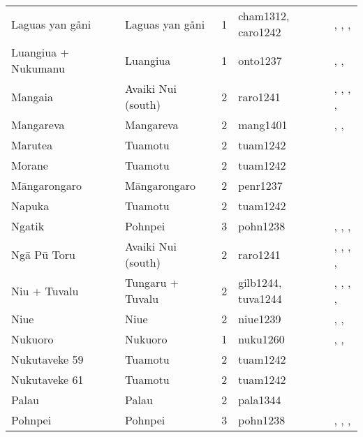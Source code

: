 \begin{longtable}{p{4.5cm}p{2cm}p{2cm}p{4cm}p{4cm}}
  Laguas yan gåni & Laguas yan gåni & 1 & cham1312, caro1242 & \citet{cordy1983social}, \citet{thompson_1971}, \citet{josephandmurray1951}, \citet{spehr1954} \\ 
  Luangiua + Nukumanu & Luangiua & 1 & onto1237 & \citet{sahlins1958social}, \citet{bayliss1974constraints}, \citet{donner1991} \\ 
  Mangaia & Avaiki Nui (south) & 2 & raro1241 & \citet{bellwood1971varieties}, \citet{buck1934}, \citet{crocombe_1967}, \citet{hayes1981cook}, \citet{walter1996} \\ 
  Mangareva & Mangareva & 2 & mang1401 & \citet{buck1938}, \citet{conte2004archaeological}, \citet{green2000mangarevan} \\ 
  Marutea & Tuamotu & 2 & tuam1242 & \citet{emory1975material} \\ 
  Morane & Tuamotu & 2 & tuam1242 & \citet{emory1975material} \\ 
  Māngarongaro & Māngarongaro & 2 & penr1237 & \citet{buck1932b} \\ 
  Napuka & Tuamotu & 2 & tuam1242 & \citet{emory1975material} \\ 
  Ngatik & Pohnpei & 3 & pohn1238 & \citet{hanlon2019upon}, \citet{haun1984prehistoric}, \citet{raynor1991indigenous}, \citet{riesenberg1968native} \\ 
  Ngā Pū Toru & Avaiki Nui (south) & 2 & raro1241 & \citet{bellwood1971varieties}, \citet{buck1934}, \citet{crocombe_1967}, \citet{hayes1981cook}, \citet{walter1996} \\ 
  Niu + Tuvalu & Tungaru + Tuvalu & 2 & gilb1244, tuva1244 & \citet{lambert1966}, \citet{lambert1975makin}, \citet{lambert1991}, \citet{macdonald1982cinderellas}, \citet{goldsmith1991} \\ 
  Niue & Niue & 2 & niue1239 & \citet{loeb1978}, \citet{smith1983niue}, \citet{walter_anderson1995} \\ 
  Nukuoro & Nukuoro & 1 & nuku1260 & \citet{carroll1966nukuoro}, \citet{carroll1975pacific}, \citet{eilers_1934} \\ 
  Nukutaveke 59 & Tuamotu & 2 & tuam1242 & \citet{emory1975material} \\ 
  Nukutaveke 61 & Tuamotu & 2 & tuam1242 & \citet{emory1975material} \\ 
  Palau & Palau & 2 & pala1344 & \citet{force1960leadership} \\ 
  Pohnpei & Pohnpei & 3 & pohn1238 & \citet{hanlon2019upon}, \citet{haun1984prehistoric}, \citet{raynor1991indigenous}, \citet{riesenberg1968native} \\ 

\end{longtable}
